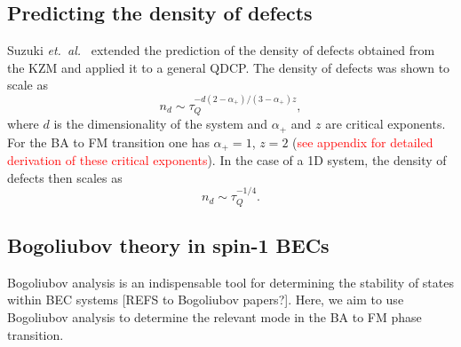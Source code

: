 \subsection{Predicting the density of defects}
Suzuki \textit{et.\ al.}~\cite{Suzuki2015} extended the prediction of the density
of defects obtained from the KZM and applied it to a general QDCP\@.
The density of defects was shown to scale as
\begin{equation}
    n_d \sim \tau_Q^{-d(2-\alpha_+)/(3-\alpha_+)z},
\end{equation}
where \( d \) is the dimensionality of the system and \( \alpha_+ \) and
\(  z \) are critical exponents.
For the BA to FM transition one has \( \alpha_+=1 \), \( z=2 \)
(\textcolor{red}{see appendix for detailed derivation of these critical
exponents}).
In the case of a 1D system, the density of defects then scales as
\begin{equation}
    n_d \sim \tau_Q^{-1/4}.
\end{equation}


\subsection{Bogoliubov theory in spin-1 BECs}
Bogoliubov analysis is an indispensable tool for determining the stability of
states within BEC systems [REFS to Bogoliubov papers?].
Here, we aim to use Bogoliubov analysis to determine the relevant mode in the
BA to FM phase transition.

